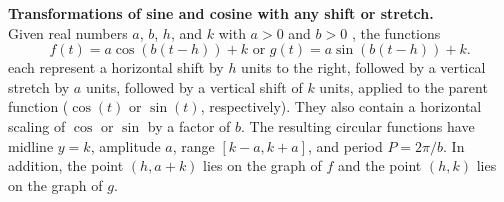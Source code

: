\documentclass{ximera}
\begin{document}
\begin{callout}
\textbf{Transformations of sine and cosine with any shift or stretch.}\\
Given real numbers \(a\), \(b\), \(h\), and \(k\) with \(a > 0\) and \(b > 0\) , the functions%
\begin{equation*}
f(t) = a\cos(b(t-h))+k \text{ or } g(t) = a\sin(b(t-h)) + k\text{.}
\end{equation*}
each represent a horizontal shift by \(h\) units to the right, followed by a vertical stretch by \(a\) units, followed by a vertical shift of \(k\) units, applied to the parent function (\(\cos(t)\) or \(\sin(t)\), respectively). They also contain a horizontal scaling of \(\cos\) or $\sin$ by a factor of \(b\).  The resulting circular functions have midline \(y = k\), amplitude \(a\), range \([k-a,k+a]\), and period \(P = 2\pi/b\).  In addition, the point \((h,a+k)\) lies on the graph of \(f\) and the point \((h, k)\) lies on the graph of \(g\).
\end{callout}
\end{document}
